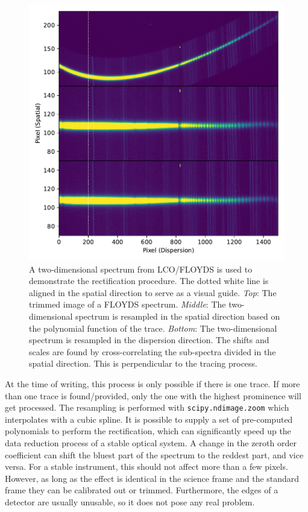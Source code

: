 \documentclass[linenumbers, twocolumn]{aastex631}
\begin{document}
\begin{figure}
    \centering
    \includegraphics[width=\columnwidth]{fig_02_rectification.pdf}
    \caption{A two-dimensional spectrum from LCO/FLOYDS is used to demonstrate
    the rectification procedure. The dotted white line is aligned in the
    spatial direction to serve as a visual guide. \textit{Top}: The trimmed image of a
    FLOYDS spectrum. \textit{Middle}: The two-dimensional spectrum is resampled in the
    spatial direction based on the polynomial function of the trace. \textit{Bottom}:
    The two-dimensional spectrum is resampled in the dispersion direction. The
    shifts and scales are found by cross-correlating the sub-spectra divided in
    the spatial direction. This is perpendicular to the tracing process.}
    \label{fig:rectify}
\end{figure}

At the time of writing, this process is only possible if there is one trace. If
more than one trace is found/provided, only the one with the highest prominence
will get processed. The resampling is performed with \texttt{scipy.ndimage.zoom} 
which interpolates with a cubic spline. It is possible to supply a set of
pre-computed polynomials to perform the rectification, which can significantly
speed up the data reduction process of a stable optical system. A change in the 
zeroth order coefficient can shift the bluest part of the spectrum to the
reddest part, and vice versa. For a stable instrument, this should not affect
more than a few pixels. However, as long as the effect is identical in the science
frame and the standard frame they can be calibrated out or trimmed. Furthermore,
the edges of a detector are usually unusable, so it does not pose any real
problem.
\end{document}
